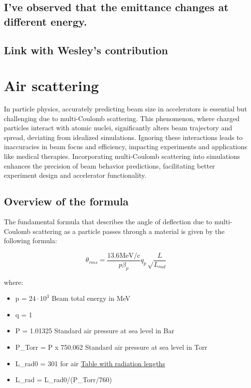 \documentclass[a4paper,
               biblatex,     %
               ]{jacow}
\begin{document}
\subsection{I've observed that the emittance changes at different energy.}
\subsection{Link with Wesley's contribution}

\section{Air scattering}

In particle physics, accurately predicting beam size in accelerators is essential but challenging due to multi-Coulomb scattering. This phenomenon, where charged particles interact with atomic nuclei, significantly alters beam trajectory and spread, deviating from idealized simulations. Ignoring these interactions leads to inaccuracies in beam focus and efficiency, impacting experiments and applications like medical therapies. Incorporating multi-Coulomb scattering into simulations enhances the precision of beam behavior predictions, facilitating better experiment design and accelerator functionality.

\subsection{Overview of the formula}

The fundamental formula that describes the angle of deflection due to multi-Coulomb scattering as a particle passes through a material is given by the following formula:

\[
\theta_{rms} = \frac{13.6 \text{MeV/c}}{p\beta_{p}}q_{p}\sqrt\frac{L}{L_{rad}}\]

where:
\begin{itemize}
\item p = $24\cdot 10^{3}$ Beam total energy in MeV
\item q = 1
\item P = 1.01325  Standard air pressure at sea level in Bar
\item P\_Torr = P x 750.062 Standard air pressure at sea level in Torr
\item L\_rad0 = 301 for air \href{https://cds.cern.ch/record/941314/files/p245.pdf}{Table with radiation lengths}
\item L\_rad = L\_rad0/(P\_Torr/760)
\end{itemize}
\end{document}
